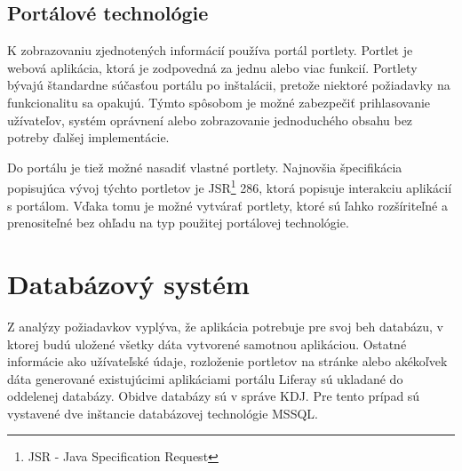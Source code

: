 \documentclass[
  print, %
  table,   %
  lof,     %
  nolot,     %
]{fithesis3}
\begin{document}
\subsection{Portálové technológie}
K zobrazovaniu zjednotených informácií používa portál portlety. Portlet je webová aplikácia, ktorá je zodpovedná za jednu alebo viac funkcií.  Portlety bývajú štandardne súčasťou portálu po inštalácii, pretože niektoré požiadavky na funkcionalitu sa opakujú. Týmto spôsobom je možné zabezpečiť prihlasovanie užívateľov, systém oprávnení alebo zobrazovanie jednoduchého obsahu bez potreby ďalšej implementácie.\cite{portal-common2}

Do portálu je tiež možné nasadiť vlastné portlety. Najnovšia špecifikácia popisujúca vývoj týchto portletov je JSR\footnote{JSR - Java Specification Request} 286, ktorá popisuje interakciu aplikácií s portálom. Vďaka tomu je možné vytvárať portlety, ktoré sú ľahko rozšíriteľné a prenositeľné bez ohľadu na typ použitej portálovej technológie.
\section{Databázový systém}
Z analýzy požiadavkov vyplýva, že aplikácia potrebuje pre svoj beh databázu, v ktorej budú uložené všetky dáta vytvorené samotnou aplikáciou. Ostatné informácie ako užívateľské údaje, rozloženie portletov na stránke alebo akékoľvek dáta generované existujúcimi aplikáciami portálu Liferay sú ukladané do oddelenej databázy. Obidve databázy sú v správe KDJ. Pre tento prípad sú vystavené dve inštancie databázovej technológie MSSQL.  
\end{document}
